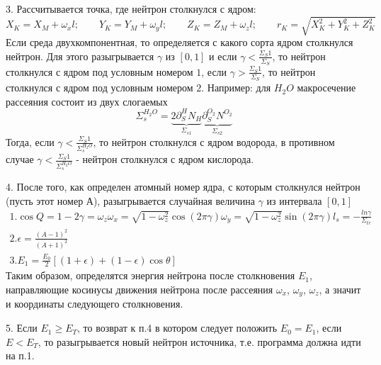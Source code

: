 \documentclass[a4paper]{article}
\begin{document}
    3. Рассчитывается точка, где нейтрон столкнулся с ядром:
    \begin{equation}\nonumber
        X_K = X_M + \omega_x l;\qquad
        Y_K = Y_M + \omega_y l;\qquad
        Z_K = Z_M + \omega_z l;\qquad
        r_K = \sqrt{X_K^2 + Y_K^2 + Z_K^2}
    \end{equation}
    Если среда двухкомпонентная, то определяется с какого сорта ядром
    столкнулся нейтрон. Для этого разыгрывается $\gamma$ из $[0,1]$ и
    если $\gamma < \frac{\Sigma_S1}{\Sigma_S}$, то нейтрон столкнулся
    с ядром под условным номером $1$, если
    $\gamma > \frac{\Sigma_S1}{\Sigma_S}$, то нейтрон столкнулся с
    ядром под условным номером $2$. Например: для $H_2 O$
    макросечение рассеяния состоит из двух слогаемых
    \begin{equation}\nonumber
        \Sigma_s^{H_2 O} =
        \underbrace{2\partial_S^H N_H}_{\Sigma_{s1}}
        \underbrace{\partial_S^{O_2}N^{O_2}}_{\Sigma_{s2}}
    \end{equation}
    Тогда, если $\gamma<\frac{\Sigma_S1}{\Sigma_s^{H_2 O}}$, то
    нейтрон столкнулся с ядром водорода, в противном случае
    $\gamma<\frac{\Sigma_S1}{\Sigma_s^{H_2 O}}$ - нейтрон столкнулся
    с ядром кислорода.

    4. После того, как определен атомный номер ядра, с которым
    столкнулся нейтрон (пусть этот номер А), разыгрывается случайная
    величина $\gamma$ из интервала $[0,1]$
    \begin{eqnarray}\nonumber
        1. \cos{Q} = 1 - 2 \gamma = \omega_z
        \omega_x = \sqrt{1-\omega_z^2}\cos{(2\pi\gamma)}
        \omega_y = \sqrt{1-\omega_z^2}\sin{(2\pi\gamma)}
        l_s = - \frac{ln{\gamma}}{\Sigma_{tr}}
        \\ \nonumber
        2. \epsilon = \frac{{(A-1)}^2}{{(A+1)}^2}
        \\ \nonumber
        3. E_1 = \frac{E_0}{2}[(1 + \epsilon) + (1 - \epsilon)
        \cos{\theta}]
    \end{eqnarray}
    Таким образом, определятся энергия нейтрона после столкновения
    $E_1$, направляющие косинусы движения нейтрона после рассеяния
    $\omega_x$, $\omega_y$, $\omega_z$, а значит и координаты
    следующего столкновения.

    5. Если $E_1 \ge E_T$, то возврат к п.4 в котором следует
    положить $E_0=E_1$, если $E < E_T$, то разыгрывается новый
    нейтрон источника, т.е. программа должна идти на п.1.
\end{document}
